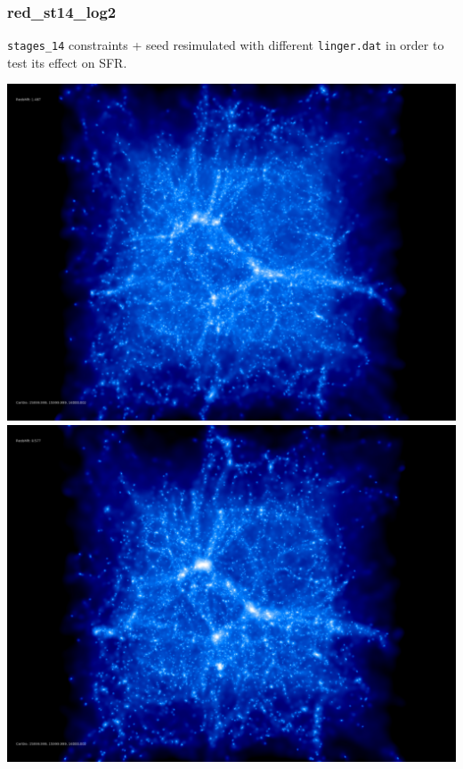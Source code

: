 % 
%
%
%
%
%
%
%

\newpage

\subsubsection{red\_st14\_log2}
\texttt{stages\_14} constraints + seed resimulated with different \texttt{linger.dat} in order
to test its effect on SFR. 

\includegraphics[scale=0.1]{r256/h100/red_st14_log2/50.jpg} 
\includegraphics[scale=0.1]{r256/h100/red_st14_log2/100.jpg} \\ 
